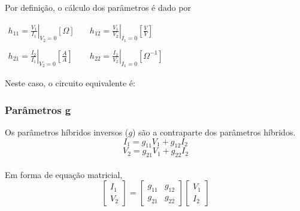 \documentclass{article}
\numberwithin{equation}{section}
\let\dfr\dfrac
\begin{document}
\noindent Por definição, o cálculo dos parâmetros é dado por
\begin{center}
    $\begin{matrix} %
            h_{11}=\displaystyle\left.\frac{V_{1}}{I_{1}}\right|_{V_{2}=0} [\Omega] &\quad h_{12}=\displaystyle\left.\frac{V_{1}}{V_{2}}\right|_{I_{1}=0}\left[\frac{V}{V}\right]\\\\
            h_{21}=\displaystyle\left.\frac{I_{2}}{I_{1}}\right|_{V_{2}=0}\left[\frac{A}{A}\right]&\quad
            h_{22}=\displaystyle\left.\frac{I_{2}}{V_{2}}\right|_{I_{1}=0} [\Omega^{-1}]
    \end{matrix}$
\end{center}

Neste caso, o circuito equivalente é:

\begin{center}
\end{center}

\subsubsection{Parâmetros g}
Os parâmetros híbridos inversos ($g$) são a contraparte dos parâmetros híbridos.
\begin{equation*}
    I_{1}=g_{11}V_{1}+g_{12}I_{2}
\end{equation*}
\begin{equation*}
    V_{2}=g_{21}V_{1}+g_{22}I_{2}
\end{equation*}\\
Em forma de equação matricial,
\begin{equation}
    \begin{bmatrix}
        I_{1} \\
        V_{2}
    \end{bmatrix}
    = %
    \begin{bmatrix}
        g_{11} & g_{12} \\
        g_{21} & g_{22}
    \end{bmatrix}
    \begin{bmatrix}
        V_{1} \\
        I_{2}
    \end{bmatrix}
\end{equation}
\end{document}
